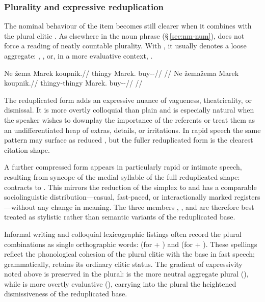 \subsubsection{Plurality and expressive reduplication}

The nominal behaviour of the item becomes still clearer when it combines with
the plural clitic . As elsewhere in the noun phrase
(§\,\ref{sec:nm-num}),  does not force a reading of neatly countable
plurality. With , it usually denotes a loose aggregate: , , or, in a more evaluative context,
.

\pex
\a
\begingl
\gla Ne žema Marek koupnik.//
\glb \Pl{} thingy Marek.\Trs{} buy-\Trs{}-\Pf{}//
\glft {}//
\endgl
\a
\begingl
\gla Ne žemažema Marek koupnik.//
\glb \Pl{} thingy-thingy Marek.\Trs{} buy-\Trs{}-\Pf{}//
\glft {}//
\endgl
\xe

The reduplicated form  adds an expressive nuance of vagueness,
theatricality, or dismissal. It is more overtly colloquial than plain 
and is especially natural when the speaker wishes to downplay the importance of
the referents or treat them as an undifferentiated heap of extras, details, or
irritations. In rapid speech the same pattern may surface as reduced
, but the fuller reduplicated form is the clearest citation shape.

A further compressed form  appears in particularly rapid or intimate
speech, resulting from syncope of the medial syllable of the full reduplicated
shape:  contracts to . This mirrors the reduction of
the simplex  to  and has a comparable sociolinguistic
distribution---casual, fast-paced, or interactionally marked registers---without
any change in meaning. The three members , , and
 are therefore best treated as stylistic rather than semantic
variants of the reduplicated base.

Informal writing and colloquial lexicographic listings often record the plural
combinations as single orthographic words:  (for  +
) and  (for  + ). These spellings
reflect the phonological cohesion of the plural clitic with the base in fast
speech; grammatically,  retains its ordinary clitic status. The
gradient of expressivity noted above is preserved in the plural: 
is the more neutral aggregate plural (),
while  is more overtly evaluative (), carrying into the plural the heightened
dismissiveness of the reduplicated base.

